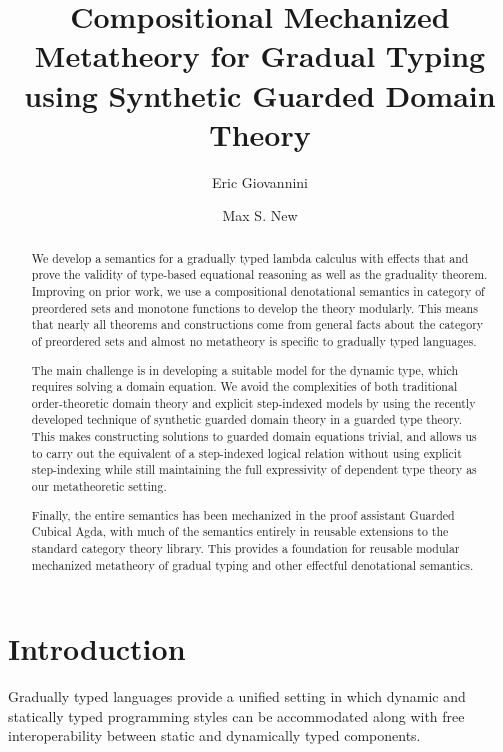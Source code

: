 \documentclass[acmsmall,screen]{acmart}
\begin{document}
\newcommand{\sem}[1]{\llbracket{}{#1}\rrbracket{}}
\newcommand{\opsemGMNV}[4]{#1 \vDash #2 \Downarrow^{#3} #4}
\newcommand{\opsemMV}[2]{\opsemGMNV \gamma {#1} n {#2}}
\newcommand{\opsemMNV}[3]{\opsemGMNV \gamma {#1} {#2} {#3}}

\title{Compositional Mechanized Metatheory for Gradual Typing using Synthetic Guarded Domain Theory}
\author{Eric Giovannini}
\author{Max S. New}

\begin{abstract}
  We develop a semantics for a gradually typed lambda calculus with
  effects that and prove the validity of type-based equational
  reasoning as well as the graduality theorem. Improving on prior
  work, we use a compositional denotational semantics in category of
  preordered sets and monotone functions to develop the theory
  modularly. This means that nearly all theorems and constructions
  come from general facts about the category of preordered sets and
  almost no metatheory is specific to gradually typed languages.

  The main challenge is in developing a suitable model for the dynamic
  type, which requires solving a domain equation. We avoid the
  complexities of both traditional order-theoretic domain theory and
  explicit step-indexed models by using the recently developed
  technique of synthetic guarded domain theory in a guarded type
  theory. This makes constructing solutions to guarded domain
  equations trivial, and allows us to carry out the equivalent of a
  step-indexed logical relation without using explicit step-indexing
  while still maintaining the full expressivity of dependent type
  theory as our metatheoretic setting.

  Finally, the entire semantics has been mechanized in the proof
  assistant Guarded Cubical Agda, with much of the semantics entirely
  in reusable extensions to the standard category theory library. This
  provides a foundation for reusable modular mechanized metatheory of
  gradual typing and other effectful denotational semantics.
\end{abstract}

\section{Introduction}

Gradually typed languages provide a unified setting in which dynamic
and statically typed programming styles can be accommodated along with
free interoperability between static and dynamically typed components.
\end{document}
